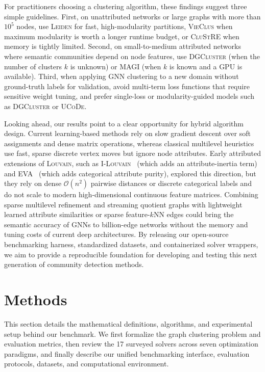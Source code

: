 \documentclass[11pt,a4paper]{article}
\begin{document}
For practitioners choosing a clustering algorithm, these findings suggest three simple guidelines. First, on unattributed networks or large graphs with more than $10^5$ nodes, use \textsc{Leiden} for fast, high-modularity partitions, \textsc{VieClus} when maximum modularity is worth a longer runtime budget, or \textsc{CluStRE} when memory is tightly limited. Second, on small-to-medium attributed networks where semantic communities depend on node features, use \textsc{DGCluster} (when the number of clusters $k$ is unknown) or \textsc{MAGI} (when $k$ is known and a GPU is available). Third, when applying GNN clustering to a new domain without ground-truth labels for validation, avoid multi-term loss functions that require sensitive weight tuning, and prefer single-loss or modularity-guided models such as \textsc{DGCluster} or \textsc{UCoDe}.

Looking ahead, our results point to a clear opportunity for hybrid algorithm design. Current learning-based methods rely on slow gradient descent over soft assignments and dense matrix operations, whereas classical multilevel heuristics use fast, sparse discrete vertex moves but ignore node attributes. Early attributed extensions of \textsc{Louvain}, such as \textsc{I-Louvain}~\cite{combe2015ilouvain} (which adds an attribute-inertia term) and \textsc{EVA}~\cite{citraro2020eva} (which adds categorical attribute purity), explored this direction, but they rely on dense $\mathcal{O}(n^2)$ pairwise distances or discrete categorical labels and do not scale to modern high-dimensional continuous feature matrices. Combining sparse multilevel refinement and streaming quotient graphs with lightweight learned attribute similarities or sparse feature-$k$NN edges could bring the semantic accuracy of GNNs to billion-edge networks without the memory and tuning costs of current deep architectures. By releasing our open-source benchmarking harness, standardized datasets, and containerized solver wrappers, we aim to provide a reproducible foundation for developing and testing this next generation of community detection methods.

\section{Methods}\label{sec:methods}
This section details the mathematical definitions, algorithms, and experimental setup behind our benchmark. We first formalize the graph clustering problem and evaluation metrics, then review the 17 surveyed solvers across seven optimization paradigms, and finally describe our unified benchmarking interface, evaluation protocols, datasets, and computational environment.
\end{document}
